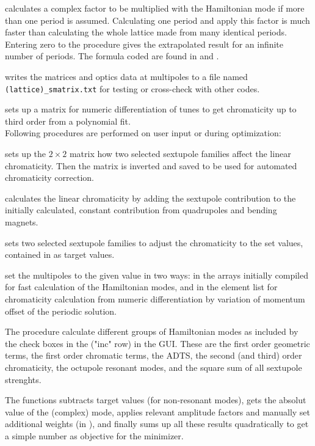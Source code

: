\documentclass[12pt]{article}
\newcommand\code[1]{{\tt #1}}
\newcommand{\ofldx}[1]{\colorbox{black!15}{(#1)}}
\newcommand{\unico}[1]{{\color{burntorange}\code{#1}}}
\newcommand{\opagui}[1]{\colorbox{blue!20}{{\color{black}\code{#1}}}}
\newcommand{\ogui}[1]{\hyperref[#1]{\opagui{#1}}}
\newcommand{\opaguif}[1]{\colorbox{violet!30}{{\color{black}\code{#1}}}}
\newcommand{\oguif}[1]{\hyperref[#1]{\opaguif{#1}}}
\begin{document}
{\unico{S\_Period} calculates a complex factor to be multiplied with the Hamiltonian mode if more than one period is assumed. Calculating one period and apply this factor is much faster than calculating the whole lattice made from many identical periods. Entering zero to the procedure gives the extrapolated result for an infinite number of periods. The formula coded are found in \cite{jbsls} and \cite{inside}.

\unico{S\_TestOut} writes the matrices and optics data at multipoles to a file named \code{(lattice)\_smatrix.txt} for testing or cross-check with other codes.

\unico{set\_cd\_matrix} sets up a matrix for numeric differentiation of tunes to get chromaticity up to third order from a polynomial fit.\\[1ex]

Following procedures are performed on user input or during optimization:

\unico{UpdateChromMatrix} sets up the $2\times 2$ matrix how two selected sextupole families affect the linear chromaticity. Then the matrix is inverted and saved to be used for automated chromaticity correction.

\unico{getLinChroma} calculates the linear chromaticity by adding the sextupole contribution to the initially calculated, constant contribution from quadrupoles and bending magnets.

\unico{ChromCorrect} sets two selected sextupole families to adjust the chromaticity to the set values, contained in \unico{HamTarg([0],[1])} as target values.

\unico{Update(SexFam, SexFamInt, OcFamInt)} set the multipoles to the given value in two ways: in the arrays initially compiled for fast calculation of the Hamiltonian modes, and in the element list \unico{Ella} for chromaticity calculation from numeric differentiation by variation of momentum offset of the periodic solution.

The \unico{DriveTerms\dots} procedure calculate different groups of Hamiltonian modes as included by the check boxes in the \ofldx{"inc" row} in the \ogui{opachroma} GUI. These are the first order geometric terms, the first order chromatic terms, the ADTS, the second (and third) order chromaticity, the octupole resonant modes, and the square sum of all sextupole strenghts.

The \unico{Penalty} functions subtracts target values (for non-resonant modes), gets the absolut value of the (complex) mode, applies relevant amplitude factors and manually set additional weights (in \oguif{chamframe}), and finally sums up all these results quadratically to get a simple number as objective for the minimizer.

}
\end{document}
